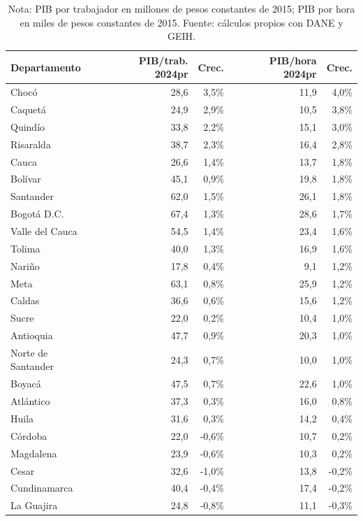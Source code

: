 \begin{table}[H]
\centering
\caption{Productividad laboral departamental, 2009--2024pr}
\label{tab:dept_productividad_resumen_24}
\scriptsize
\begin{tabular}{lrrrr}
\toprule
Departamento & PIB/trab. 2024pr & Crec. & PIB/hora 2024pr & Crec. \\
\midrule
Chocó & 28,6 & 3,5\% & 11,9 & 4,0\% \\
Caquetá & 24,9 & 2,9\% & 10,5 & 3,8\% \\
Quindío & 33,8 & 2,2\% & 15,1 & 3,0\% \\
Risaralda & 38,7 & 2,3\% & 16,4 & 2,8\% \\
Cauca & 26,6 & 1,4\% & 13,7 & 1,8\% \\
Bolívar & 45,1 & 0,9\% & 19,8 & 1,8\% \\
Santander & 62,0 & 1,5\% & 26,1 & 1,8\% \\
Bogotá D.C. & 67,4 & 1,3\% & 28,6 & 1,7\% \\
Valle del Cauca & 54,5 & 1,4\% & 23,4 & 1,6\% \\
Tolima & 40,0 & 1,3\% & 16,9 & 1,6\% \\
Nariño & 17,8 & 0,4\% & 9,1 & 1,2\% \\
Meta & 63,1 & 0,8\% & 25,9 & 1,2\% \\
Caldas & 36,6 & 0,6\% & 15,6 & 1,2\% \\
Sucre & 22,0 & 0,2\% & 10,4 & 1,0\% \\
Antioquia & 47,7 & 0,9\% & 20,3 & 1,0\% \\
Norte de Santander & 24,3 & 0,7\% & 10,0 & 1,0\% \\
Boyacá & 47,5 & 0,7\% & 22,6 & 1,0\% \\
Atlántico & 37,3 & 0,3\% & 16,0 & 0,8\% \\
Huila & 31,6 & 0,3\% & 14,2 & 0,4\% \\
Córdoba & 22,0 & -0,6\% & 10,7 & 0,2\% \\
Magdalena & 23,9 & -0,6\% & 10,3 & 0,2\% \\
Cesar & 32,6 & -1,0\% & 13,8 & -0,2\% \\
Cundinamarca & 40,4 & -0,4\% & 17,4 & -0,2\% \\
La Guajira & 24,8 & -0,8\% & 11,1 & -0,3\% \\
\bottomrule
\end{tabular}
\caption*{\footnotesize Nota: PIB por trabajador en millones de pesos constantes de 2015; PIB por hora en miles de pesos constantes de 2015. Fuente: cálculos propios con DANE y GEIH.}
\end{table}